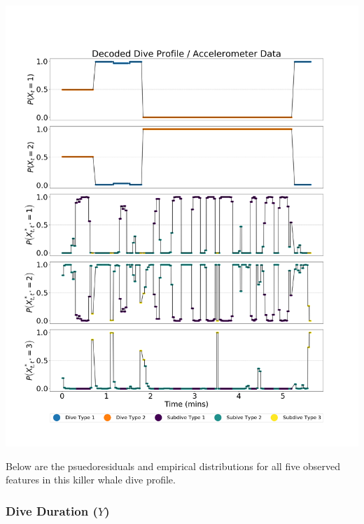 \documentclass[12pt]{TD-CJS}
\begin{document}
\includegraphics[width=5.5in]{../Plots/CarHHMM2_decoded_states.png}
\newpage

Below are the psuedoresiduals and empirical distributions for all five observed features in this killer whale dive profile. 

\subsubsection{Dive Duration ($Y$)}
\end{document}
